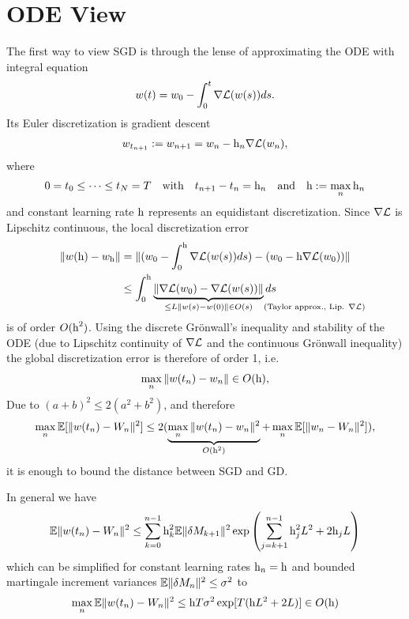 \section{ODE View}

The first way to view SGD is through the lense of approximating the ODE with
integral equation
\begin{align*}
	w(t) =  w_0 -\int_{0}^{t}\nabla\mathcal{L}(w(s))ds.
\end{align*}
Its Euler discretization is gradient descent 
\begin{align*}
	w_{t_{n+1}}:=w_{n+1}
	= w_n - \text{h}_n \nabla\mathcal{L}(w_n),
\end{align*}
where
\begin{align*}
	0=t_0 \le \dots \le t_N= T \quad \text{with} \quad t_{n+1}-t_n=\text{h}_n
	\quad \text{and}\quad \text{h}:=\max_n \text{h}_n
\end{align*}
and constant learning rate \(\text{h}\) represents an equidistant discretization.
Since \(\nabla\mathcal{L}\) is Lipschitz continuous, the local discretization error
\begin{align*}
	\|\weights(\lr)  - \weights_\lr \|
	&= \|(\weights_0 - \int_0^\lr\nabla\Loss(\weights(s))ds) - (\weights_0-\lr\nabla\Loss(\weights_0))\|\\
	&\le  \int_0^\lr \underbrace{\|\nabla\Loss(\weights_0) - \nabla\Loss(\weights(s))\|}_{
		\le \ubound \|\weights(s) - \weights(0)\| \in O(s) \mathrlap{\quad\text{(Taylor approx., Lip. \(\nabla\Loss\))}}
	}ds 
\end{align*}
is of order \(O(\text{h}^2)\). 
Using the discrete Gr\"onwall's inequality and stability of the ODE (due to Lipschitz continuity of
\(\nabla\mathcal{L}\) and the continuous Gr\"onwall inequality) the global discretization
error is therefore of order 1, i.e.
\begin{align*}
	\max_{n} \|w(t_n) - w_n\| \in O(\text{h}),
\end{align*}
Due to \((a+b)^2\le2(a^2+b^2)\), and therefore 
\begin{align*}
	\max_n\mathbb{E}[\|w(t_n)-W_n\|^2]
	\le 2(\underbrace{\max_n \|w(t_n)-w_n\|^2}_{O(\text{h}^2)}
	+\max_{n}\mathbb{E}[\|w_n - W_n\|^2]),
\end{align*}
it is enough to bound the distance between SGD and GD.
\begin{theorem}\label{thm: distance SGD vs GD}
	In general we have
	\begin{align*}
		\mathbb{E}\|w(t_n)-W_n\|^2
		\le \sum_{k=0}^{n-1}\text{h}_k^2\mathbb{E}\|\delta M_{k+1}\|^2\exp\left(
			\sum_{j=k+1}^{n-1}\text{h}_j^2L^2 + 2\text{h}_jL
		\right)
	\end{align*}
	which can be simplified for constant learning rates \(\text{h}_n=\text{h}\) and bounded
	martingale increment variances \(\mathbb{E}\|\delta M_n\|^2 \le \sigma^2\) to
	\begin{align*}
		\max_{n}\mathbb{E}\|w(t_n)	-W_n\|^2
		\le \text{h} T\sigma^2\exp[T(\text{h}L^2 + 2L)] \in O(\text{h})
	\end{align*}
\end{theorem}
